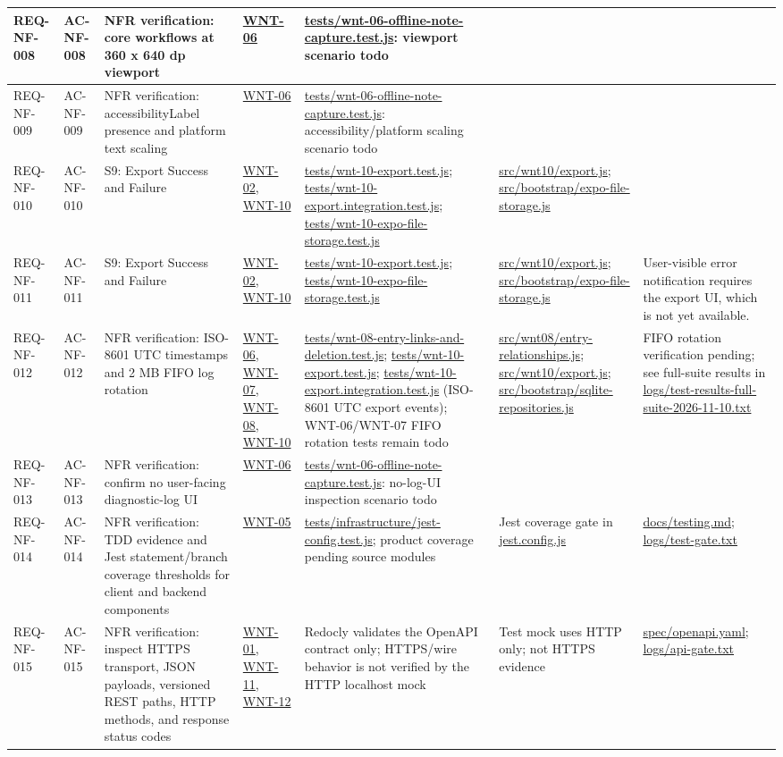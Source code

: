 \documentclass[10pt,a4paper]{article}
\renewcommand{\texttt}[1]{\url{#1}}
\begin{document}
\begin{longtable}{|L{2.5cm}|L{2.6cm}|L{4.4cm}|L{3.3cm}|L{3.3cm}|L{3.3cm}|L{3.3cm}|}
REQ-NF-008 & AC-NF-008 & NFR verification: core workflows at 360 x 640 dp viewport & \texttt{WNT-06} & \texttt{tests/wnt-06-offline-note-capture.test.js}: viewport scenario todo & & \\ \hline
REQ-NF-009 & AC-NF-009 & NFR verification: accessibilityLabel presence and platform text scaling & \texttt{WNT-06} & \texttt{tests/wnt-06-offline-note-capture.test.js}: accessibility/platform scaling scenario todo & & \\ \hline
REQ-NF-010 & AC-NF-010 & S9: Export Success and Failure & \texttt{WNT-02}, \texttt{WNT-10} & \texttt{tests/wnt-10-export.test.js}; \texttt{tests/wnt-10-export.integration.test.js}; \texttt{tests/wnt-10-expo-file-storage.test.js} & \texttt{src/wnt10/export.js}; \texttt{src/bootstrap/expo-file-storage.js} & \\ \hline
REQ-NF-011 & AC-NF-011 & S9: Export Success and Failure & \texttt{WNT-02}, \texttt{WNT-10} & \texttt{tests/wnt-10-export.test.js}; \texttt{tests/wnt-10-expo-file-storage.test.js} & \texttt{src/wnt10/export.js}; \texttt{src/bootstrap/expo-file-storage.js} & User-visible error notification requires the export UI, which is not yet available. \\ \hline
REQ-NF-012 & AC-NF-012 & NFR verification: ISO-8601 UTC timestamps and 2 MB FIFO log rotation & \texttt{WNT-06}, \texttt{WNT-07}, \texttt{WNT-08}, \texttt{WNT-10} & \texttt{tests/wnt-08-entry-links-and-deletion.test.js}; \texttt{tests/wnt-10-export.test.js}; \texttt{tests/wnt-10-export.integration.test.js} (ISO-8601 UTC export events); WNT-06/WNT-07 FIFO rotation tests remain todo & \texttt{src/wnt08/entry-relationships.js}; \texttt{src/wnt10/export.js}; \texttt{src/bootstrap/sqlite-repositories.js} & FIFO rotation verification pending; see full-suite results in \texttt{logs/test-results-full-suite-2026-11-10.txt} \\ \hline
REQ-NF-013 & AC-NF-013 & NFR verification: confirm no user-facing diagnostic-log UI & \texttt{WNT-06} & \texttt{tests/wnt-06-offline-note-capture.test.js}: no-log-UI inspection scenario todo & & \\ \hline
REQ-NF-014 & AC-NF-014 & NFR verification: TDD evidence and Jest statement/branch coverage thresholds for client and backend components & \texttt{WNT-05} & \texttt{tests/infrastructure/jest-config.test.js}; product coverage pending source modules & Jest coverage gate in \texttt{jest.config.js} & \texttt{docs/testing.md}; \texttt{logs/test-gate.txt} \\ \hline
REQ-NF-015 & AC-NF-015 & NFR verification: inspect HTTPS transport, JSON payloads, versioned REST paths, HTTP methods, and response status codes & \texttt{WNT-01}, \texttt{WNT-11}, \texttt{WNT-12} & Redocly validates the OpenAPI contract only; HTTPS/wire behavior is not verified by the HTTP localhost mock & Test mock uses HTTP only; not HTTPS evidence & \texttt{spec/openapi.yaml}; \texttt{logs/api-gate.txt} \\ \hline
\end{longtable}
\end{document}
